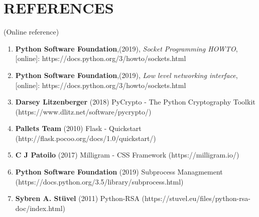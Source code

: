 \chapter*{\rm \large \bf REFERENCES}
\vspace{4.0mm}
\setlength{\parindent}{1cm} 

\scriptsize{(Online reference)}
\begin{enumerate}
    \item \textbf{Python Software Foundation},(2019),
        \textit{Socket Programming HOWTO},\\
        \hspace{15mm}[online]: https://docs.python.org/3/howto/sockets.html

    \item \textbf{Python Software Foundation},(2019),
        \textit{Low level networking interface},\\
        \hspace{15mm}[online]: https://docs.python.org/3/howto/sockets.html

    \item \textbf{Darsey Litzenberger} (2018) PyCrypto - The Python Cryptography
        Toolkit (https://www.dlitz.net/software/pycrypto/)

    \item \textbf{Pallets Team} (2010) Flask - Quickstart
        (http://flask.pocoo.org/docs/1.0/quickstart/)

    \item \textbf{C J Patoilo} (2017) Milligram - CSS Framework
        (https://milligram.io/)

    \item \textbf{Python Software Foundation} (2019) Subprocess Managmement
        (https://docs.python.org/3.5/library/subprocess.html)

    \item \textbf{Sybren A. Stüvel} (2011) Python-RSA
        (https://stuvel.eu/files/python-rsa-doc/index.html)
\end{enumerate}

